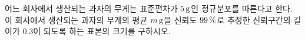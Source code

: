 어느 회사에서 생산되는 과자의 무게는 표준편차가 \mbox{$5\mkern3mu \mathrm{g}$인} 정규분포를 따른다고 한다. 이 회사에서 생산되는 과자의 무게의 평균 $m\mkern3mu \mathrm{g}$을 신뢰도 $99\mkern3mu \%$로 추정한 신뢰구간의 길이가 $0.3$이 되도록 하는 표본의 크기를 구하시오. 
